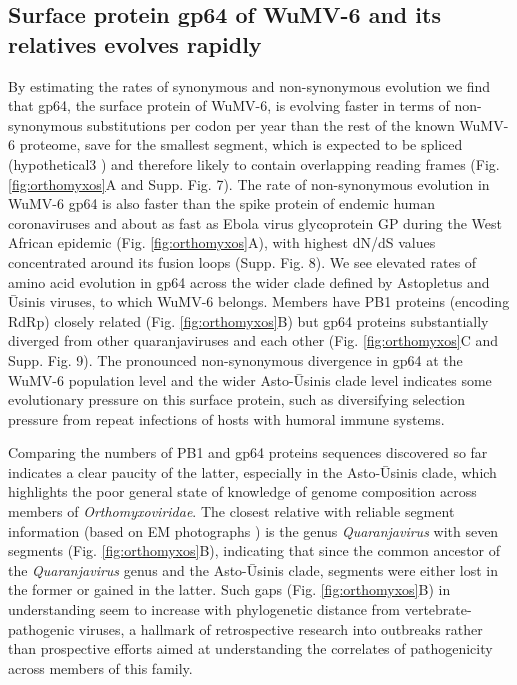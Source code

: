 \documentclass[11pt]{article}
\begin{document}
\subsection{Surface protein gp64 of WuMV-6 and its relatives evolves rapidly}

By estimating the rates of synonymous and non-synonymous evolution we find that gp64, the surface protein of WuMV-6, is evolving faster in terms of non-synonymous substitutions per codon per year than the rest of the known WuMV-6 proteome, save for the smallest segment, which is expected to be spliced (hypothetical3 \citep{batson_single_2021}) and therefore likely to contain overlapping reading frames (Fig. \ref{fig:orthomyxos}A and Supp. Fig. 7).
The rate of non-synonymous evolution in WuMV-6 gp64 is also faster than the spike protein of endemic human coronaviruses \citep{kistler_evidence_2021} and about as fast as Ebola virus glycoprotein GP during the West African epidemic \citep{park_ebola_2015}(Fig. \ref{fig:orthomyxos}A), with highest dN/dS values concentrated around its fusion loops \citep{garry_proteomics_2008} (Supp. Fig. 8).
We see elevated rates of amino acid evolution in gp64 across the wider clade defined by Astopletus and \={U}sinis viruses, to which WuMV-6 belongs.
Members have PB1 proteins (encoding RdRp) closely related (Fig. \ref{fig:orthomyxos}B) but gp64 proteins substantially diverged from other quaranjaviruses and each other (Fig. \ref{fig:orthomyxos}C and Supp. Fig. 9).
The pronounced non-synonymous divergence in gp64 at the WuMV-6 population level and the wider Asto-\={U}sinis clade level indicates some evolutionary pressure on this surface protein, such as diversifying selection pressure from repeat infections of hosts with humoral immune systems.


Comparing the numbers of PB1 and gp64 proteins sequences discovered so far indicates a clear paucity of the latter, especially in the Asto-\={U}sinis clade, which highlights the poor general state of knowledge of genome composition across members of \textit{Orthomyxoviridae}.
The closest relative with reliable segment information (based on EM photographs \citep{allison_cyclic_2015}) is the genus \textit{Quaranjavirus} with seven segments (Fig. \ref{fig:orthomyxos}B), indicating that since the common ancestor of the \textit{Quaranjavirus} genus and the Asto-\={U}sinis clade, segments were either lost in the former or gained in the latter.
Such gaps (Fig. \ref{fig:orthomyxos}B) in understanding seem to increase with phylogenetic distance from vertebrate-pathogenic viruses, a hallmark of retrospective research into outbreaks rather than prospective efforts aimed at understanding the correlates of pathogenicity across members of this family.
\end{document}
